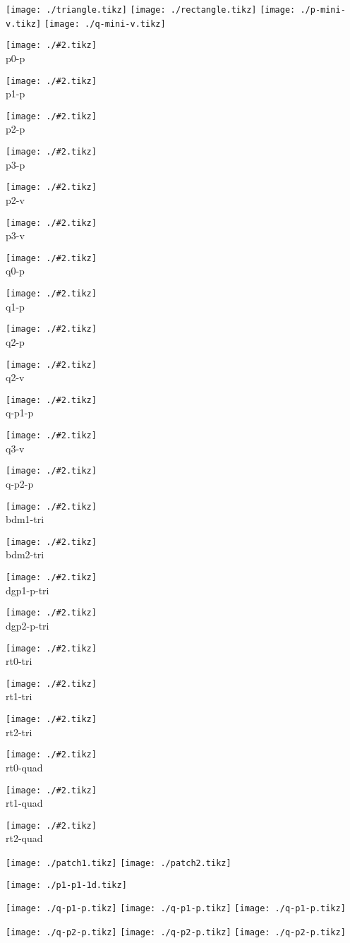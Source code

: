 \documentclass{article}
\newcommand{\showtikz}[2]{\begin{minipage}{#1\textwidth}
    \begin{center}
      \texttt{[image: ./\#2.tikz]}
      \\
      #2
    \end{center}
  \end{minipage}
}
\begin{document}
\texttt{[image: ./triangle.tikz]}
\texttt{[image: ./rectangle.tikz]}
\texttt{[image: ./p-mini-v.tikz]}
\texttt{[image: ./q-mini-v.tikz]}

\showtikz{.24}{p0-p}
\showtikz{.24}{p1-p}
\showtikz{.24}{p2-p}
\showtikz{.24}{p3-p}

\showtikz{.24}{p2-v}
\showtikz{.24}{p3-v}

\showtikz{.24}{q0-p}
\showtikz{.24}{q1-p}
\showtikz{.24}{q2-p}

\showtikz{.24}{q2-v}
\showtikz{.24}{q-p1-p}
\showtikz{.24}{q3-v}
\showtikz{.24}{q-p2-p}

\showtikz{.24}{bdm1-tri}
\showtikz{.24}{bdm2-tri}
\showtikz{.24}{dgp1-p-tri}
\showtikz{.24}{dgp2-p-tri}

\showtikz{.24}{rt0-tri}
\showtikz{.24}{rt1-tri}
\showtikz{.24}{rt2-tri}

\showtikz{.24}{rt0-quad}
\showtikz{.24}{rt1-quad}
\showtikz{.24}{rt2-quad}

\texttt{[image: ./patch1.tikz]}
\texttt{[image: ./patch2.tikz]}

\texttt{[image: ./p1-p1-1d.tikz]}

\texttt{[image: ./q-p1-p.tikz]}
\texttt{[image: ./q-p1-p.tikz]}
\texttt{[image: ./q-p1-p.tikz]}

\texttt{[image: ./q-p2-p.tikz]}
\texttt{[image: ./q-p2-p.tikz]}
\texttt{[image: ./q-p2-p.tikz]}

\end{document}
